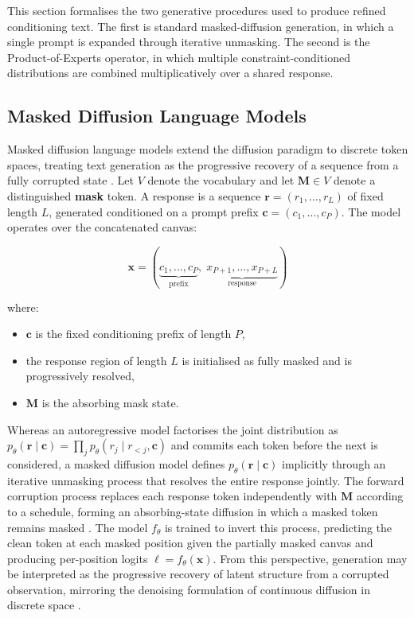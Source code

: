 \documentclass[a4paper,twoside,12pt]{report}
\begin{document}
This section formalises the two generative procedures used to produce refined
conditioning text. The first is standard masked-diffusion generation, in which
a single prompt is expanded through iterative unmasking. The second is the
Product-of-Experts operator, in which multiple constraint-conditioned
distributions are combined multiplicatively over a shared response.

\subsection{Masked Diffusion Language Models}

Masked diffusion language models extend the diffusion paradigm to discrete
token spaces, treating text generation as the progressive recovery of a
sequence from a fully corrupted state \citep{austin2021structured,
li2022diffusionlm}. Let \(V\) denote the vocabulary and let \(\mathbf{M} \in
V\) denote a distinguished \textbf{mask} token. A response is a sequence
\(\mathbf{r} = (r_1, \dots, r_L)\) of fixed length \(L\), generated conditioned
on a prompt prefix \(\mathbf{c} = (c_1, \dots, c_P)\). The model operates over
the concatenated canvas:

\begin{equation}
\mathbf{x} = (\underbrace{c_1,\dots,c_P}_{\text{prefix}},\;
             \underbrace{x_{P+1},\dots,x_{P+L}}_{\text{response}})
\end{equation}

where:
\begin{itemize}
  \item \(\mathbf{c}\) is the fixed conditioning prefix of length \(P\),
  \item the response region of length \(L\) is initialised as fully masked and
        is progressively resolved,
  \item \(\mathbf{M}\) is the absorbing mask state.
\end{itemize}

Whereas an autoregressive model factorises the joint distribution as
\(p_\theta(\mathbf{r}\mid\mathbf{c}) = \prod_{j} p_\theta(r_j \mid r_{<j},
\mathbf{c})\) and commits each token before the next is considered, a masked
diffusion model defines \(p_\theta(\mathbf{r}\mid\mathbf{c})\) implicitly
through an iterative unmasking process that resolves the entire response
jointly. The forward corruption process replaces each response token
independently with \(\mathbf{M}\) according to a schedule, forming an
absorbing-state diffusion in which a masked token remains masked
\citep{austin2021structured}. The model \(f_\theta\) is trained to invert this
process, predicting the clean token at each masked position given the partially
masked canvas and producing per-position logits \(\boldsymbol{\ell} =
f_\theta(\mathbf{x})\). From this perspective, generation may be interpreted as
the progressive recovery of latent structure from a corrupted observation,
mirroring the denoising formulation of continuous diffusion in discrete space
\citep{li2022diffusionlm, austin2021structured}.
\end{document}
